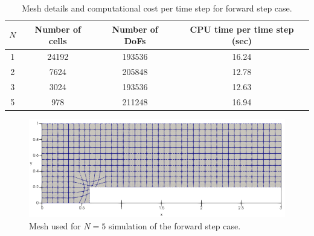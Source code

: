 \documentclass[a4paper,11pt,oneside]{article}
\begin{document}
\begin{table}[htbp]
	\centering
	\caption{Mesh details and computational cost per time step for forward step case.}
	\label{tab:forward_facing_step_mesh_cpu}
	\begin{tabular}{S[table-format=1.0, table-text-alignment=left] S[table-format=5.0, table-text-alignment=left] S[table-format=6.0, table-text-alignment=left] S[table-format=2.2, table-text-alignment=left]}
		\toprule
		{$N$} & {Number of cells} & {Number of DoFs} & {CPU time per time step (sec)} \\
		 & 24192 & 193536 & 16.24 \\
		2 & 7624 & 205848 & 12.78 \\
		3 & 3024 & 193536 & 12.63 \\
		5 & 978 & 211248 & 16.94 \\
		\bottomrule
	\end{tabular}
\end{table}

\begin{figure}[htbp]
	\centering
	\includegraphics[width=0.8\linewidth]{figures/forward_facing_step/mesh_N5}
	\caption{Mesh used for $N=5$ simulation of the forward step case.}
	\label{fig:forward_facing_step_mesh_N5}
\end{figure}
\end{document}
